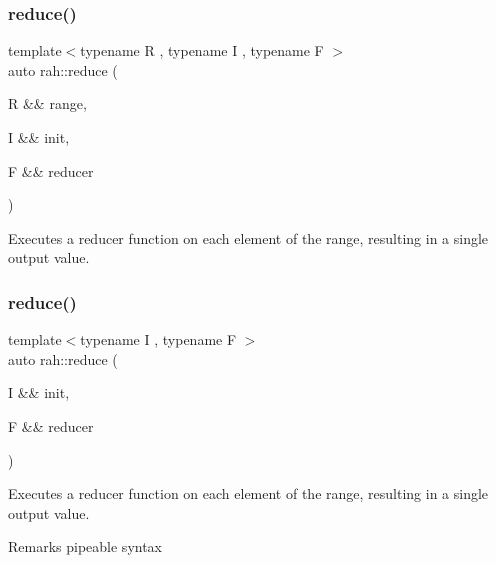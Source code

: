 \subsubsection{\texorpdfstring{reduce()}{reduce()}\hspace{0.1cm}{\footnotesize\ttfamily [1/2]}}
{\footnotesize\ttfamily template$<$typename R , typename I , typename F $>$ \\
auto rah\+::reduce (\begin{DoxyParamCaption}\item[{R \&\&}]{range,  }\item[{I \&\&}]{init,  }\item[{F \&\&}]{reducer }\end{DoxyParamCaption})}



Executes a reducer function on each element of the range, resulting in a single output value. 


\begin{DoxyCodeInclude}{0}
\end{DoxyCodeInclude}
\mbox{\label{namespacerah_a6a6b7b7e3b78bb4bd16372fbb688c152}} 
\subsubsection{\texorpdfstring{reduce()}{reduce()}\hspace{0.1cm}{\footnotesize\ttfamily [2/2]}}
{\footnotesize\ttfamily template$<$typename I , typename F $>$ \\
auto rah\+::reduce (\begin{DoxyParamCaption}\item[{I \&\&}]{init,  }\item[{F \&\&}]{reducer }\end{DoxyParamCaption})}



Executes a reducer function on each element of the range, resulting in a single output value. 

\begin{DoxyRemark}{Remarks}
pipeable syntax
\end{DoxyRemark}


